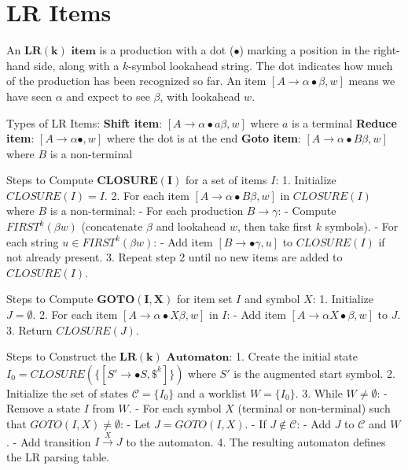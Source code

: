 \section{LR Items}

An $\mathbf{LR(k) \text{ item}}$ is a production with a dot ($\bullet$) marking a position in the right-hand side, along with a $k$-symbol lookahead string. The dot indicates how much of the production has been recognized so far. An item $[A \to \alpha \bullet \beta, w]$ means we have seen $\alpha$ and expect to see $\beta$, with lookahead $w$.

Types of LR Items:
\textbf{Shift item}: $[A \to \alpha \bullet a \beta, w]$ where $a$ is a terminal
\textbf{Reduce item}: $[A \to \alpha \bullet, w]$ where the dot is at the end
\textbf{Goto item}: $[A \to \alpha \bullet B \beta, w]$ where $B$ is a non-terminal

Steps to Compute $\mathbf{CLOSURE(I)}$ for a set of items $I$:
1. Initialize $CLOSURE(I) = I$.
2. For each item $[A \to \alpha \bullet B \beta, w]$ in $CLOSURE(I)$ where $B$ is a non-terminal:
   - For each production $B \to \gamma$:
     - Compute $FIRST^k(\beta w)$ (concatenate $\beta$ and lookahead $w$, then take first $k$ symbols).
     - For each string $u \in FIRST^k(\beta w)$:
       - Add item $[B \to \bullet \gamma, u]$ to $CLOSURE(I)$ if not already present.
3. Repeat step 2 until no new items are added to $CLOSURE(I)$.

Steps to Compute $\mathbf{GOTO(I, X)}$ for item set $I$ and symbol $X$:
1. Initialize $J = \emptyset$.
2. For each item $[A \to \alpha \bullet X \beta, w]$ in $I$:
   - Add item $[A \to \alpha X \bullet \beta, w]$ to $J$.
3. Return $CLOSURE(J)$.

Steps to Construct the $\mathbf{LR(k) \text{ Automaton}}$:
1. Create the initial state $I_0 = CLOSURE(\{[S' \to \bullet S, \$^k]\})$ where $S'$ is the augmented start symbol.
2. Initialize the set of states $\mathcal{C} = \{I_0\}$ and a worklist $W = \{I_0\}$.
3. While $W \neq \emptyset$:
   - Remove a state $I$ from $W$.
   - For each symbol $X$ (terminal or non-terminal) such that $GOTO(I, X) \neq \emptyset$:
     - Let $J = GOTO(I, X)$.
     - If $J \notin \mathcal{C}$:
       - Add $J$ to $\mathcal{C}$ and $W$.
     - Add transition $I \xrightarrow{X} J$ to the automaton.
4. The resulting automaton defines the LR parsing table.
